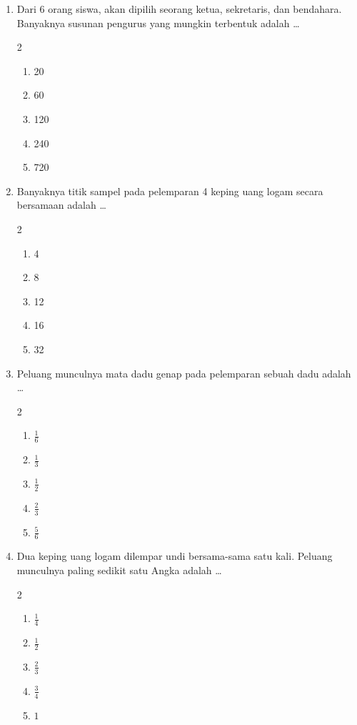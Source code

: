 \documentclass[12pt,a4paper]{article}
\begin{document}
\begin{enumerate}[itemsep=2ex]
    \item Dari 6 orang siswa, akan dipilih seorang ketua, sekretaris, dan bendahara. Banyaknya susunan pengurus yang mungkin terbentuk adalah \dots
    \begin{multicols}{2}
    \begin{enumerate}[label=\Alph*.]
        \item 20
        \item 60
        \item 120
        \item 240
        \item 720
    \end{enumerate}
    \end{multicols}

    \item Banyaknya titik sampel pada pelemparan 4 keping uang logam secara bersamaan adalah \dots
    \begin{multicols}{2}
    \begin{enumerate}[label=\Alph*.]
        \item 4
        \item 8
        \item 12
        \item 16
        \item 32
    \end{enumerate}
    \end{multicols}

    \item Peluang munculnya mata dadu genap pada pelemparan sebuah dadu adalah \dots
    \begin{multicols}{2}
    \begin{enumerate}[label=\Alph*.]
        \item $\frac{1}{6}$
        \item $\frac{1}{3}$
        \item $\frac{1}{2}$
        \item $\frac{2}{3}$
        \item $\frac{5}{6}$
    \end{enumerate}
    \end{multicols}

    \item Dua keping uang logam dilempar undi bersama-sama satu kali. Peluang munculnya paling sedikit satu Angka adalah \dots
    \begin{multicols}{2}
    \begin{enumerate}[label=\Alph*.]
        \item $\frac{1}{4}$
        \item $\frac{1}{2}$
        \item $\frac{2}{3}$
        \item $\frac{3}{4}$
        \item $1$
    \end{enumerate}
    \end{multicols}


\end{enumerate}
\end{document}
